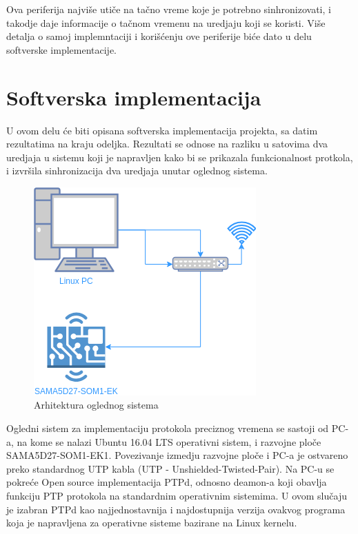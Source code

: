 \documentclass[a4paper,12pt, master]{etf}
\begin{document}
    Ova periferija najvi\v{s}e uti\v{c}e na ta\v{c}no vreme koje je potrebno
    sinhronizovati, i takodje daje informacije o ta\v{c}nom vremenu na uredjaju
    koji se koristi. Vi\v{s}e detalja o samoj implemntaciji i kori\v{s}\'{c}enju
    ove periferije bi\'{c}e dato u delu softverske implementacije.

	\newpage

	\chapter{Softverska implementacija}

    U ovom delu \'{c}e biti opisana softverska implementacija projekta, sa
	datim rezultatima na kraju odeljka. Rezultati se odnose na razliku u
	satovima dva uredjaja u sistemu koji je napravljen kako bi se prikazala
	funkcionalnost protkola, i izvr\v{s}ila sinhronizacija dva uredjaja unutar
	oglednog sistema.

	\begin{figure}[htb]
			\centering
			\includegraphics[scale=.5]{../pic/arch.png}
			\caption{Arhitektura oglednog sistema}
			\label{fig:arch_system}
	\end{figure}

    Ogledni sistem za implementaciju protokola preciznog vremena se sastoji
	od PC-a, na kome se nalazi Ubuntu 16.04 LTS operativni sistem, i razvojne
	plo\v{c}e SAMA5D27-SOM1-EK1. Povezivanje izmedju razvojne plo\v{c}e i PC-a
	je ostvareno preko standardnog UTP kabla (UTP - Unshielded-Twisted-Pair).
	Na PC-u se pokre\'{c}e Open source implementacija PTPd, odnosno deamon-a
	koji obavlja funkciju PTP protokola na standardnim operativnim sistemima. U
	ovom slu\v{c}aju je izabran PTPd kao najjednostavnija i najdostupnija
	verzija ovakvog programa koja je napravljena za operativne sisteme bazirane
	na Linux kernelu.
\end{document}
